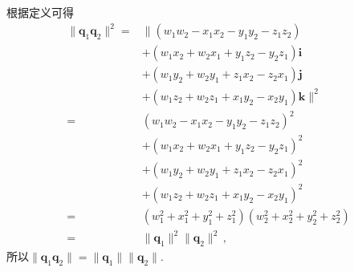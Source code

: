 \begin{prove}
    根据定义可得
    \begin{align}
        \|{\bm q}_1{\bm q}_2\|^2 = & \|(w_1w_2-x_1x_2-y_1y_2-z_1z_2)\nonumber                    \\
                                   & +(w_1x_2+w_2x_1+y_1z_2-y_2z_1)\mathbf{i}\nonumber           \\
                                   & +(w_1y_2+w_2y_1+z_1x_2-z_2x_1)\mathbf{j}\nonumber           \\
                                   & +(w_1z_2+w_2z_1+x_1y_2-x_2y_1)\mathbf{k}\|^2\nonumber       \\
        =                          & (w_1w_2-x_1x_2-y_1y_2-z_1z_2)^2\nonumber                    \\
                                   & +(w_1x_2+w_2x_1+y_1z_2-y_2z_1)^2\nonumber                   \\
                                   & +(w_1y_2+w_2y_1+z_1x_2-z_2x_1)^2\nonumber                   \\
                                   & +(w_1z_2+w_2z_1+x_1y_2-x_2y_1)^2\nonumber                   \\
        =                          & (w_1^2+x_1^2+y_1^2+z_1^2)(w_2^2+x_2^2+y_2^2+z_2^2)\nonumber \\
        =                          & \|{\bm q}_1\|^2\|{\bm q}_2\|^2\, ,
    \end{align}
    所以$\|{\bm q}_1{\bm q}_2\|=\|{\bm q}_1\|\|{\bm q}_2\|$.
\end{prove}

